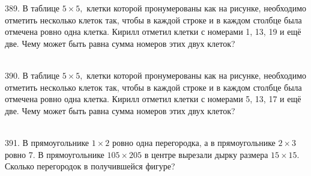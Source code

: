 \documentclass[12pt]{article}
\begin{document}
389. В таблице $5\times5,$ клетки которой пронумерованы как на рисунке, необходимо отметить несколько клеток так, чтобы в каждой строке и в каждом столбце была отмечена ровно одна клетка. Кирилл отметил клетки с номерами 1, 13, 19 и ещё две. Чему может быть равна сумма номеров этих двух клеток?\\
\begin{figure}[ht!]
\end{figure}\\
390. В таблице $5\times5,$ клетки которой пронумерованы как на рисунке, необходимо отметить несколько клеток так, чтобы в каждой строке и в каждом столбце была отмечена ровно одна клетка. Кирилл отметил клетки с номерами 5, 13, 17 и ещё две. Чему может быть равна сумма номеров этих двух клеток?\\
\begin{figure}[ht!]
\end{figure}\\
391. В прямоугольнике $1\times2$ ровно одна перегородка, а в прямоугольнике $2\times3$ ровно 7. В прямоугольнике $105\times205$ в центре вырезали
дырку размера $15\times15.$ Сколько перегородок в получившейся фигуре?\\
\end{document}
